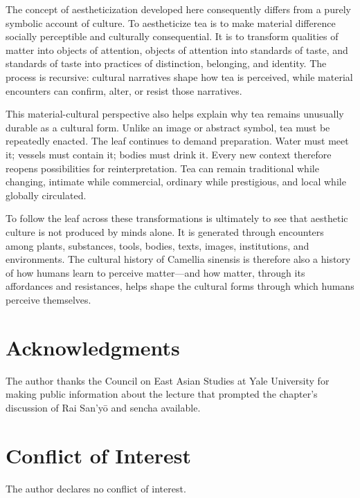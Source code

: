 \documentclass[11pt,a4paper]{article}
\begin{document}
The concept of aestheticization developed here consequently differs from a purely symbolic account of culture. To aestheticize tea is to make material difference socially perceptible and culturally consequential. It is to transform qualities of matter into objects of attention, objects of attention into standards of taste, and standards of taste into practices of distinction, belonging, and identity. The process is recursive: cultural narratives shape how tea is perceived, while material encounters can confirm, alter, or resist those narratives.

This material-cultural perspective also helps explain why tea remains unusually durable as a cultural form. Unlike an image or abstract symbol, tea must be repeatedly enacted. The leaf continues to demand preparation. Water must meet it; vessels must contain it; bodies must drink it. Every new context therefore reopens possibilities for reinterpretation. Tea can remain traditional while changing, intimate while commercial, ordinary while prestigious, and local while globally circulated.

To follow the leaf across these transformations is ultimately to see that aesthetic culture is not produced by minds alone. It is generated through encounters among plants, substances, tools, bodies, texts, images, institutions, and environments. The cultural history of Camellia sinensis is therefore also a history of how humans learn to perceive matter---and how matter, through its affordances and resistances, helps shape the cultural forms through which humans perceive themselves.

\section*{Acknowledgments}

The author thanks the Council on East Asian Studies at Yale University for making public information about the lecture that prompted the chapter's discussion of Rai San'yō and sencha available.

\section*{Conflict of Interest}

The author declares no conflict of interest.
\end{document}
